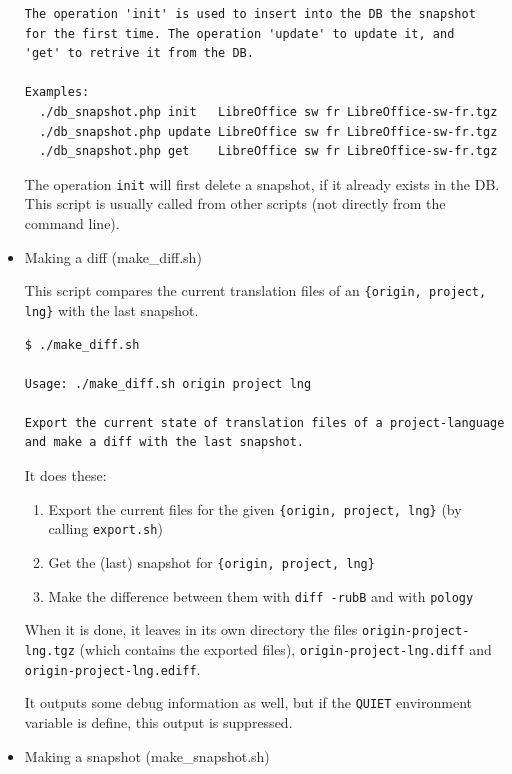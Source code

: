 \documentclass[11pt]{article}
\begin{document}
\begin{itemize}
\begin{verbatim}
The operation 'init' is used to insert into the DB the snapshot
for the first time. The operation 'update' to update it, and
'get' to retrive it from the DB.

Examples:
  ./db_snapshot.php init   LibreOffice sw fr LibreOffice-sw-fr.tgz
  ./db_snapshot.php update LibreOffice sw fr LibreOffice-sw-fr.tgz
  ./db_snapshot.php get    LibreOffice sw fr LibreOffice-sw-fr.tgz
\end{verbatim}



     The operation \texttt{init} will first delete a snapshot, if it already
     exists in the DB. This script is usually called from other scripts
     (not directly from the command line).


\item Making a diff (make\_{}diff.sh)\\
\label{sec-8.4.4.3}


     This script compares the current translation files of an \texttt{\{origin,      project, lng\}} with the last snapshot.


\begin{verbatim}
$ ./make_diff.sh

Usage: ./make_diff.sh origin project lng

Export the current state of translation files of a project-language
and make a diff with the last snapshot.
\end{verbatim}



     It does these:
\begin{enumerate}
\item Export the current files for the given \texttt{\{origin, project, lng\}}
        (by calling \texttt{export.sh})
\item Get the (last) snapshot for \texttt{\{origin, project, lng\}}
\item Make the difference between them with \texttt{diff -rubB} and with \texttt{pology}
\end{enumerate}
     When it is done, it leaves in its own directory the files
     \texttt{origin-project-lng.tgz} (which contains the exported files),
     \texttt{origin-project-lng.diff} and \texttt{origin-project-lng.ediff}.

    It outputs some debug information as well, but if the \texttt{QUIET}
    environment variable is define, this output is suppressed.



\item Making a snapshot (make\_{}snapshot.sh)\\
\label{sec-8.4.4.4}




\end{itemize}
\end{document}
